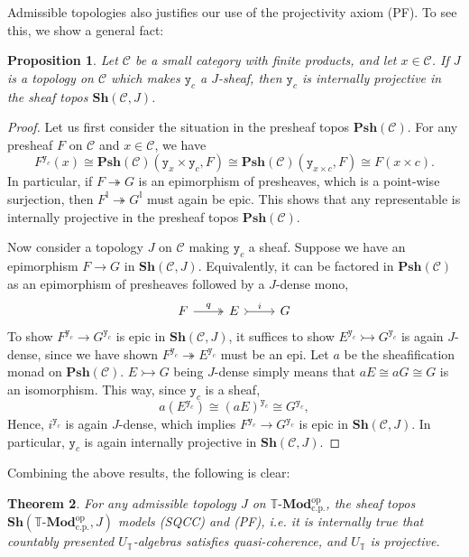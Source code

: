 \documentclass[12pt]{amsart}
\newtheorem{theorem}{Theorem}[section]
\newtheorem{proposition}[theorem]{Proposition}
\theoremstyle{definition}
\newcommand{\mc}[1]{\mathcal{#1}}
\newcommand{\mb}[1]{\mathbf{#1}}
\newcommand{\mbb}[1]{\mathbb{#1}}
\newcommand{\T}{\mbb T}
\newcommand{\I}{\mbb I}
\newcommand{\mr}[1]{\mathrm{#1}}
\newcommand{\sh}{\mb{Sh}}
\newcommand{\psh}{\mb{Psh}}
\newcommand{\op}{^{\mathrm{op}}}
\newcommand{\yon}{\mathtt{y}}
\newcommand{\surj}{\twoheadrightarrow}
\newcommand{\inj}{\rightarrowtail}
\newcommand{\cp}{_{\mr{c.p.}}}
\newcommand{\mmod}[1]{#1\text{-}\mathbf{Mod}}
\DeclareRobustCommand{\yon}{\text{\usefont{U}{dmjhira}{m}{n}\symbol{"48}}}
\begin{document}
Admissible topologies also justifies our use of the projectivity axiom (PF). To see this, we show a general fact:

\begin{proposition}
  Let $\mc C$ be a small category with finite products, and let $x\in\mc C$. If $J$ is a topology on $\mc C$ which makes $\yon_c$ a $J$-sheaf, then $\yon_c$ is internally projective in the sheaf topos $\sh(\mc C,J)$.
\end{proposition}
\begin{proof}
  Let us first consider the situation in the presheaf topos $\psh(\mc C)$. For any presheaf $F$ on $\mc C$ and $x\in\mc C$, we have
  \[ F^{\yon_c}(x) \cong \psh(\mc C)(\yon_{x} \times \yon_{c},F) \cong \psh(\mc C)(\yon_{x\times c},F) \cong F(x \times c). \]
  In particular, if $F \surj G$ is an epimorphism of presheaves, which is a point-wise surjection, then $F^\I \surj G^\I$ must again be epic. This shows that any representable is internally projective in the presheaf topos $\psh(\mc C)$.

  Now consider a topology $J$ on $\mc C$ making $\yon_c$ a sheaf. Suppose we have an epimorphism $F \to G$ in $\sh(\mc C,J)$. Equivalently, it can be factored in $\psh(\mc C)$ as an epimorphism of presheaves followed by a $J$-dense mono,
  \[
  \begin{tikzcd}
    F \ar[r, two heads, "q"] & E \ar[r, tail, "i"] & G
  \end{tikzcd}
  \]
  To show $F^{\yon_c} \to G^{\yon_c}$ is epic in $\sh(\mc C,J)$, it suffices to show $E^{\yon_c} \inj G^{\yon_c}$ is again $J$-dense, since we have shown $F^{\yon_c} \surj E^{\yon_c}$ must be an epi. Let $a$ be the sheafification monad on $\psh(\mc C)$. $E \inj G$ being $J$-dense simply means that $aE \cong aG \cong G$ is an isomorphism. This way, since $\yon_c$ is a sheaf,
  \[ a(E^{\yon_c}) \cong (aE)^{\yon_c} \cong G^{\yon_c}, \]
  Hence, $i^{\yon_c}$ is again $J$-dense, which implies $F^{\yon_c} \to G^{\yon_c}$ is epic in $\sh(\mc C,J)$. In particular, $\yon_c$ is again internally projective in $\sh(\mc C,J)$.
\end{proof}

Combining the above results, the following is clear:

\begin{theorem}
  For any admissible topology $J$ on $\mmod\T\cp\op$, the sheaf topos $\sh(\mmod\T\cp\op,J)$ models (SQCC) and (PF), i.e. it is internally true that countably presented $U_\T$-algebras satisfies quasi-coherence, and $U_\T$ is projective.
\end{theorem}
\end{document}
